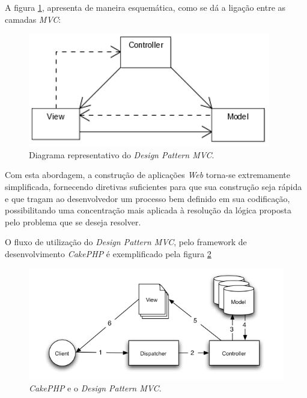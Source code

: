 A figura \ref{figura:MVC}, apresenta de maneira esquemática, como se dá a ligação entre as camadas \textit{MVC}:

\clearpage
\begin{figure}[h!tp]
    \begin{center}
        \includegraphics[scale=1]{./figuras/ModelViewControllerDiagram.png}

        \caption{\label{figura:MVC}Diagrama representativo do \textit{Design Pattern MVC}.}
    \end{center}
\end{figure}

Com esta abordagem, a construção de aplicações \textit{Web} torna-se extremamente simplificada, fornecendo diretivas suficientes para que sua construção seja rápida e que tragam ao desenvolvedor um processo bem definido em sua codificação, possibilitando uma concentração mais aplicada à resolução da lógica proposta pelo problema que se deseja resolver.

O fluxo de utilização do \textit{Design Pattern MVC}, pelo framework de desenvolvimento \nohyphens{\textit{CakePHP}} é exemplificado pela figura \ref{figura:MVC_CakePHP}

\begin{figure}[h!tp]
    \begin{center}
        \includegraphics[scale=0.8]{./figuras/basic_mvc_cake.png}

        \caption{\label{figura:MVC_CakePHP}\textit{CakePHP} e o \textit{Design Pattern MVC}.}
    \end{center}
\end{figure}

